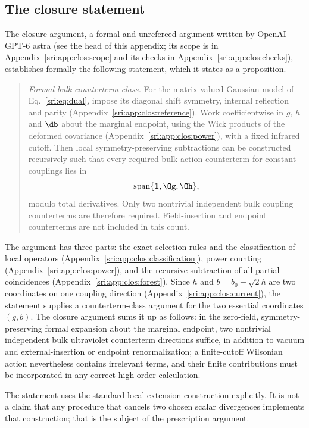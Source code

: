 \subsection{The closure statement}\label{sri:app:clos:closure}
The closure argument, a formal and unrefereed argument written by OpenAI GPT-6 astra (see the head of this
appendix; its scope is in Appendix~\ref{sri:app:clos:scope} and its checks in Appendix~\ref{sri:app:clos:checks}), establishes
formally the following statement, which it states as a proposition.
\begin{quote}
\emph{Formal bulk counterterm class.} For the matrix-valued Gaussian model of Eq.~\eqref{sri:eq:dual}, impose its diagonal
shift symmetry, internal reflection and parity (Appendix~\ref{sri:app:clos:reference}). Work coefficientwise in $g$, $h$
and $\db$ about the marginal endpoint, using the Wick products of the deformed covariance
(Appendix~\ref{sri:app:clos:power}), with a fixed infrared cutoff. Then local symmetry-preserving subtractions can be
constructed recursively such that every required bulk action counterterm for constant couplings lies in
\begin{equation}
 \mathrm{span}\{\mathbf 1,\Og,\Oh\},
 \label{sri:eq:clos:span}
\end{equation}
modulo total derivatives. Only two nontrivial independent bulk coupling counterterms are therefore required.
Field-insertion and endpoint counterterms are not included in this count.
\end{quote}
The argument has three parts: the exact selection rules and the classification of local operators
(Appendix~\ref{sri:app:clos:classification}), power counting (Appendix~\ref{sri:app:clos:power}), and the recursive subtraction
of all partial coincidences (Appendix~\ref{sri:app:clos:forest}). Since $h$ and $b=b_0-\sqrt2h$ are two coordinates on one
coupling direction (Appendix~\ref{sri:app:clos:current}), the statement supplies a counterterm-class argument for the two
essential coordinates $(g,b)$. The closure argument sums it up as follows: in the zero-field, symmetry-preserving formal
expansion about the marginal endpoint, two nontrivial independent bulk ultraviolet counterterm directions suffice, in
addition to vacuum and external-insertion or endpoint renormalization; a finite-cutoff Wilsonian action nevertheless
contains irrelevant terms, and their finite contributions must be incorporated in any correct high-order calculation.

The statement uses the standard local extension construction explicitly. It is not a claim that any procedure that
cancels two chosen scalar divergences implements that construction; that is the subject of the prescription argument.

